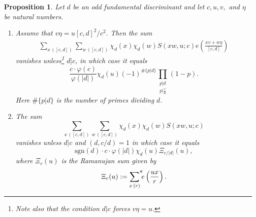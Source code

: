 \documentclass[a4paper,10pt,twoside]{amsart}
\newtheorem{prop}[theorem]{Proposition}
\theoremstyle{definition}
\numberwithin{equation}{section}
\renewcommand\:{\colon}
\begin{document}
\begin{prop}\label{twisted-Kloosterman-sum}
Let $d$ be an odd fundamental discriminant and let $c,u,v,$ and $\eta$ be natural numbers.
\begin{enumerate}
\item Assume that $v\eta=u[c,d]^2/c^2$. Then the sum 
\begin{align*}
\sum_{x\,([c,d])}\sum_{w\,([c,d])}\chi_d(x)\chi_d(w)S\left(xw,u;c\right)e\left(\frac{xv+w\eta}{[c,d]}\right)
\end{align*}
vanishes unless\footnote{Note also that the condition $d|c$ forces $v\eta=u$.} $d|c$, in which case it equals 
\[ 
\frac{c\cdot\varphi(c)}{\varphi(|d|)}\chi_d(u)(-1)^{\#\{p|d\}}\prod_{\substack{p|d\\
p|\frac cd}}(1-p).
\]
Here $\#\{p|d\}$ is the number of primes dividing $d$. 

\item The sum
\[
\sum_{x\,([c,d])}\sum_{w\,([c,d])}\chi_d(x)\chi_d(w)S\left(xw,u;c\right)
\]
vanishes unless $d|c$ and $(d,c/d)=1$ in which case it equals 
\[
\text{sgn}(d)\cdot c\cdot\varphi(|d|)\chi_d(u)\Xi_{c/|d|}(u),
\]
where $\Xi_r(u)$ is the Ramanujan sum given by
\[
\Xi_r(u):=\mathop{{\sum}^{\makebox[0pt][l]{$*$}}}_{x\,(r)}e\left(\frac{ux}{r}\right).
\]
\end{enumerate}
\end{prop}
\end{document}
